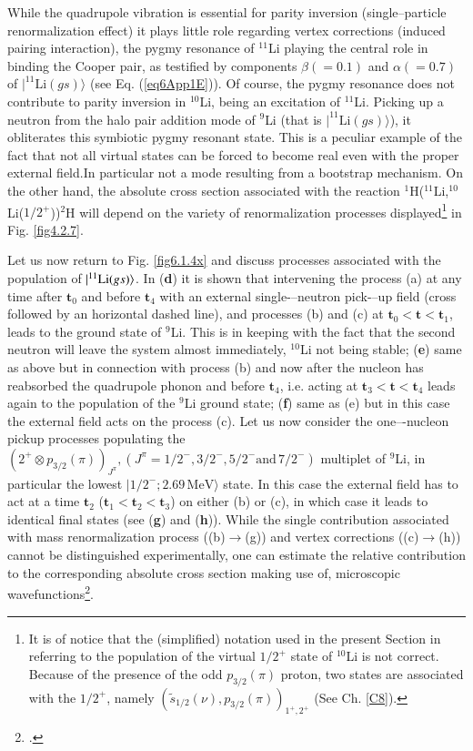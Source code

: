 While the quadrupole vibration is essential for parity inversion (single--particle renormalization effect) it plays little role regarding vertex corrections (induced pairing interaction), the pygmy resonance of $^{11}$Li playing the central role in binding the Cooper pair, as testified by components $\beta(=0.1)$ and $\alpha(=0.7)$ of $|^{11}\text{Li}(gs)\rangle$ (see Eq. (\ref{eq6App1E})). Of course, the pygmy resonance does not contribute to parity inversion in $^{10}$Li, being an excitation of $^{11}$Li.  Picking up a neutron from the halo pair addition mode of $^9$Li (that is $|^{11}\text{Li}(gs)\rangle$), it obliterates this symbiotic pygmy resonant state. This is  a peculiar example of the fact that not all virtual states can be forced to become real even with the proper external field.In particular not a mode resulting from a bootstrap mechanism. On the other hand, the absolute cross section associated with the reaction  $^1$H($^{11}$Li,$^{10}$Li($1/2^+$))$^2$H will depend on the variety of renormalization processes displayed\footnote{It is of notice that the (simplified) notation used in the present Section in referring to the population of the virtual $1/2^+$ state of $^{10}$Li is not correct. Because of the presence of the odd $p_{3/2}(\pi)$ proton, two states are associated with the $1/2^+$, namely $\left(\tilde s_{1/2}(\nu),p_{3/2}(\pi)\right)_{1^+,2^+}$ (See Ch. \ref{C8}).} in Fig. \ref{fig4.2.7}.  


Let us now return to Fig. \ref{fig6.1.4x} and discuss processes associated with the population of $|{^{11}\text{Li}(gs)} \rangle$. In (\textbf{d}) it is shown that intervening the process (a) at any time after
$\mathbf{t}_0$ and before $\mathbf{t}_4$ with an external single-–neutron pick-–up field (cross followed by an horizontal dashed line), and processes (b) and (c) at $\mathbf{t}_0<\mathbf{t}<\mathbf{t}_1$, 
 leads to the ground state of $^9$Li. This is in keeping with the fact that the second neutron will leave the system
almost immediately, $^{10}$Li not being stable; (\textbf{e}) same as above but in connection with process (b) and now after the nucleon has reabsorbed
the quadrupole phonon and before $\mathbf{t}_4$, i.e. acting at $\mathbf{t}_3<\mathbf{t}<\mathbf{t}_4$ leads again to the population of the $^9$Li ground state; (\textbf{f}) same as (e) but in this case the external field acts on the process (c). Let us now consider
the one–-nucleon pickup processes populating the $(2^+\otimes p_{3/2}(\pi))_{J^{\pi}}, (J^{\pi}=1/2^-,3/2^-,5/2^-\text{and}\, 7/2^-)$ multiplet of $^9$Li, in particular the lowest
$|1/2^-;2.69\, \text{MeV}\rangle$ state. In this case the external field has to act at a time $\mathbf{t}_2$ ($\mathbf t_1<\mathbf t_2<\mathbf t_3$) on either (b) or (c), in which case it leads to identical final states (see (\textbf{g}) and  (\textbf{h})). While
the single contribution associated with mass renormalization process ((b)$\rightarrow$(g)) and vertex corrections ((c)$\rightarrow$(h)) cannot be 
distinguished experimentally, one can estimate the relative contribution to the corresponding absolute cross section making use of, microscopic wavefunctions\footnote{\cite{Barranco:01}.}.


